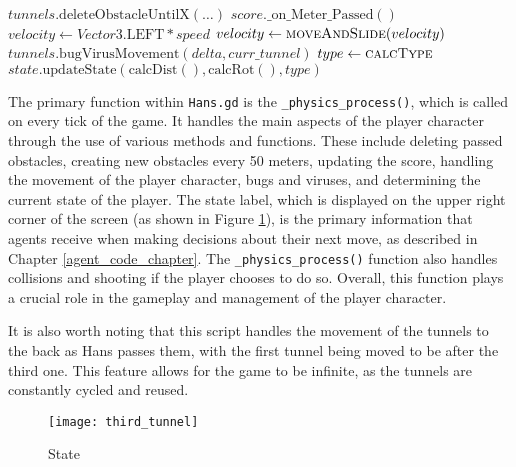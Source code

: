 \begin{algorithm}
\begin{algorithmic}[1]
\State $tunnels.\text{deleteObstacleUntilX}(\dots)$
 
\State {}
\EndIf
\State $score.\text{\_on\_Meter\_Passed}()$
\State $velocity \gets Vector3.\text{LEFT} * speed$
\State $velocity \gets \Call{moveAndSlide}{velocity}$
\State {}
\State $tunnels.\text{bugVirusMovement}(delta, curr\_tunnel)$
\State {}
\EndIf
\State $type \gets \Call{calcType}{}$
\State $state.\text{updateState}(\text{calcDist}(),\text{calcRot}(),type)$
\EndFunction
\end{algorithmic}
\end{algorithm}

The primary function within \texttt{Hans.gd} is the \texttt{\_physics\_process()}, which is called on every tick of the game. It handles the main aspects of the player character through the use of various methods and functions. These include deleting passed obstacles, creating new obstacles every 50 meters, updating the score, handling the movement of the player character, bugs and viruses, and determining the current state of the player. The state label, which is displayed on the upper right corner of the screen (as shown in Figure \ref{fig:third_tunnel}), is the primary information that agents receive when making decisions about their next move, as described in Chapter \ref{agent_code_chapter}. The \texttt{\_physics\_process()} function also handles collisions and shooting if the player chooses to do so. Overall, this function plays a crucial role in the gameplay and management of the player character.

It is also worth noting that this script handles the movement of the tunnels to the back as Hans passes them, with the first tunnel being moved to be after the third one. This feature allows for the game to be infinite, as the tunnels are constantly cycled and reused.

\begin{figure}[h]
    \centering
    \texttt{[image: third\_tunnel]}
    \caption{State}
    \label{fig:third_tunnel}
\end{figure}

